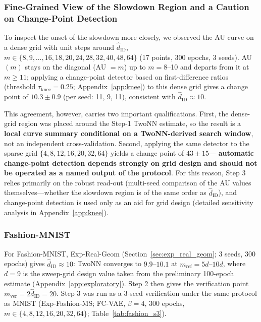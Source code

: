 \documentclass[make,article,submit,pdftex,moreauthors]{Definitions/mdpi}
\newcommand{\hatdID}{\hat{d}_{\mathrm{ID}}}
\begin{document}
\subsubsection{Fine-Grained View of the Slowdown Region and a Caution on Change-Point Detection}\label{sec:exp_mnist_dense}

To inspect the onset of the slowdown more closely, we observed the AU curve
on a dense grid with unit steps around $\hatdID$,
$m \in \{8, 9, \ldots, 16, 18, 20, 24, 28, 32, 40, 48, 64\}$ (17 points,
300 epochs, 3 seeds).
AU$(m)$ stays on the diagonal (AU $= m$) up to $m = 8$--10 and departs from
it at $m \geq 11$; applying a change-point detector based on
first-difference ratios (threshold $\tau_{\mathrm{knee}} = 0.25$;
Appendix~\ref{app:knee}) to this dense grid gives a change point of
$10.3 \pm 0.9$ (per seed: 11, 9, 11), consistent with
$\hatdID \approx 10$.

This agreement, however, carries two important qualifications.
First, the dense-grid region was placed around the Step-1 TwoNN estimate,
so the result is a \textbf{local curve summary conditional on a
TwoNN-derived search window}, not an independent cross-validation.
Second, applying the same detector to the sparse grid
$\{4, 8, 12, 16, 20, 32, 64\}$ yields a change point of $43 \pm 15$---%
\textbf{automatic change-point detection depends strongly on grid design and
should not be operated as a named output of the protocol}.
For this reason, Step 3 relies primarily on the robust read-out
(multi-seed comparison of the AU values themselves---whether the slowdown
region is of the same order as $\hatdID$), and change-point detection is
used only as an aid for grid design (detailed sensitivity analysis in
Appendix~\ref{app:knee}).

\subsubsection{Fashion-MNIST}\label{sec:exp_fashion}

For Fashion-MNIST, Exp-Real-Geom (Section~\ref{sec:exp_real_geom}; 3 seeds,
300 epochs) gives $\hatdID \approx 10$: TwoNN converges to $9.9$--$10.1$
at $m_{\mathrm{ref}} = 5d$--$10d$, where $d = 9$ is the sweep-grid design
value taken from the preliminary 100-epoch estimate
(Appendix~\ref{app:exploratory}).
Step 2 then gives the verification point $m_{\mathrm{ver}} = 2\hatdID = 20$.
Step 3 was run as a 3-seed verification under the same protocol as MNIST
(Exp-Fashion-MS; FC-VAE, $\beta = 4$, 300 epochs,
$m \in \{4, 8, 12, 16, 20, 32, 64\}$; Table~\ref{tab:fashion_s3}).
\end{document}
